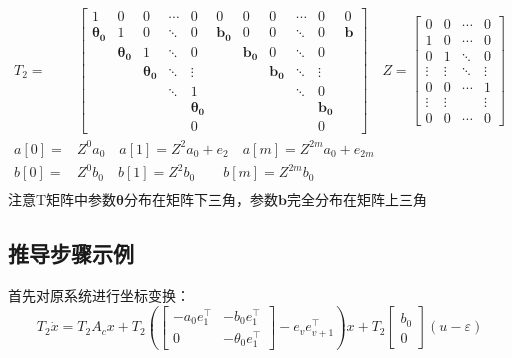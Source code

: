 \documentclass[a4paper,12pt]{article}
\begin{document}
\begin{align*}
    T_2 = & 
    \left[
        \begin{array}{ccccc|ccccc|c}
            1 & 0 & 0 & \cdots & 0 & 0 & 0 & 0 & \cdots & 0 & 0 \\
            \mathbf{\theta_0} & 1 & 0 & \ddots & 0 & \mathbf{b_0} & 0 & 0 & \ddots & 0 & \mathbf{b} \\
            & \mathbf{\theta_0} & 1 & \ddots & 0 &  & \mathbf{b_0} & 0 & \ddots & 0 &  \\ 
            &  & \mathbf{\theta_0} & \ddots & \vdots &  &  & \mathbf{b_0} & \ddots & \vdots & \\
            &  &  & \ddots & 1 &  &  &  & \ddots & 0 & \\
            &  &  &  & \mathbf{\theta_0} &  &  &  &  & \mathbf{b_0}&  \\
            &  &  &  & 0 &  &  &  &  & 0 & 
        \end{array}
    \right]
    \quad
    Z = \begin{bmatrix}
        0 & 0 & \cdots & 0 \\
        1 & 0 & \cdots & 0 \\
        0 & 1 & \ddots & 0 \\
        \vdots & \vdots & \ddots & \vdots \\
        0 & 0 & \cdots & 1 \\
        \vdots & \vdots &  & \vdots \\
        0 & 0 & \cdots & 0
    \end{bmatrix}\\
    a[0] =& Z^0 a_0 \quad a[1] = Z^2 a_0 + e_2 \quad a[m] = Z^{2m} a_0 + e_{2m}\\
    b[0] =& Z^0 b_0 \quad b[1] = Z^2 b_0 \qquad b[m] = Z^{2m} b_0\\
\end{align*}
注意T矩阵中参数$\boldsymbol{\theta}$分布在矩阵下三角，参数$\boldsymbol{b}$完全分布在矩阵上三角

\subsection*{推导步骤示例}
首先对原系统进行坐标变换：
\[
    T_2\dot{x} =    
    T_2 A_c x + 
    T_2 \left(
        \left[
        \begin{array}{c|c}
        -a_0e_1^\top & -b_0e_1^\top\\ \hline
        0 & -\theta_0e_1^\top 
        \end{array}
        \right]
        - e_ve_{v+1}^\top
    \right)
     x + 
    T_2 \begin{bmatrix}
        b_0 \\ 0
    \end{bmatrix} (u-\varepsilon)
\]
\end{document}
